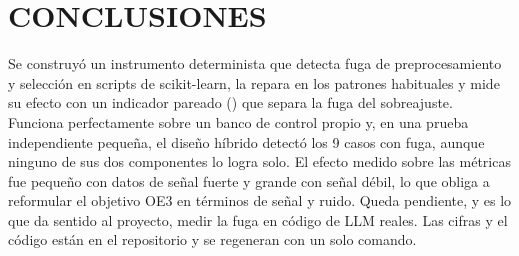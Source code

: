 
\chapter{CONCLUSIONES}
\label{ch:conclusiones}

Se construyó un instrumento determinista que detecta fuga de preprocesamiento y selección en scripts de scikit-learn, la repara en los patrones habituales y mide su efecto con un indicador pareado (\DOpt) que separa la fuga del sobreajuste. Funciona perfectamente sobre un banco de control propio y, en una prueba independiente pequeña, el diseño híbrido detectó los 9 casos con fuga, aunque ninguno de sus dos componentes lo logra solo. El efecto medido sobre las métricas fue pequeño con datos de señal fuerte y grande con señal débil, lo que obliga a reformular el objetivo OE3 en términos de señal y ruido. Queda pendiente, y es lo que da sentido al proyecto, medir la fuga en código de LLM reales. Las cifras y el código están en el repositorio y se regeneran con un solo comando.
